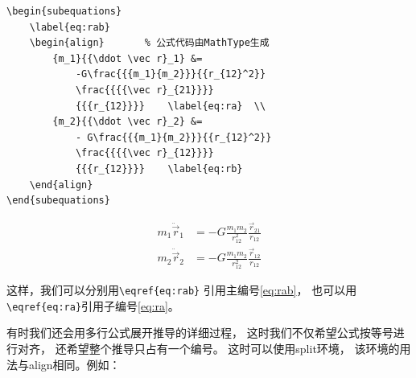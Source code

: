 \documentclass[UTF8]{ctexart}
\numberwithin{equation}{section}			%
\begin{document}
\begin{lstlisting}
\begin{subequations}
    \label{eq:rab}
    \begin{align}		% 公式代码由MathType生成
        {m_1}{{\ddot \vec r}_1} &=  
            -G\frac{{{m_1}{m_2}}}{{r_{12}^2}}
            \frac{{{{\vec r}_{21}}}}
            {{{r_{12}}}} 	\label{eq:ra}  \\
        {m_2}{{\ddot \vec r}_2} &=  
            - G\frac{{{m_1}{m_2}}}{{r_{12}^2}}
            \frac{{{{\vec r}_{12}}}}
            {{{r_{12}}}} 	\label{eq:rb}
    \end{align} 
\end{subequations}
\end{lstlisting}
    \begin{subequations}
        \label{eq:rab}
        \begin{align}		%
            {m_1}{{\ddot \vec r}_1} &=  
                -G\frac{{{m_1}{m_2}}}{{r_{12}^2}}
                \frac{{{{\vec r}_{21}}}}
                {{{r_{12}}}} 	\label{eq:ra}  \\
            {m_2}{{\ddot \vec r}_2} &=  
                - G\frac{{{m_1}{m_2}}}{{r_{12}^2}}
                \frac{{{{\vec r}_{12}}}}
                {{{r_{12}}}} 	\label{eq:rb}
        \end{align} 
    \end{subequations}

    这样，我们可以分别用\verb|\eqref{eq:rab}|
    引用主编号\eqref{eq:rab}，
    也可以用\verb|\eqref{eq:ra}|引用子编号\eqref{eq:ra}。
    
    有时我们还会用多行公式展开推导的详细过程，
    这时我们不仅希望公式按等号进行对齐，
    还希望整个推导只占有一个编号。
    这时可以使用split环境，
    该环境的用法与align相同。例如：
    
\end{document}
